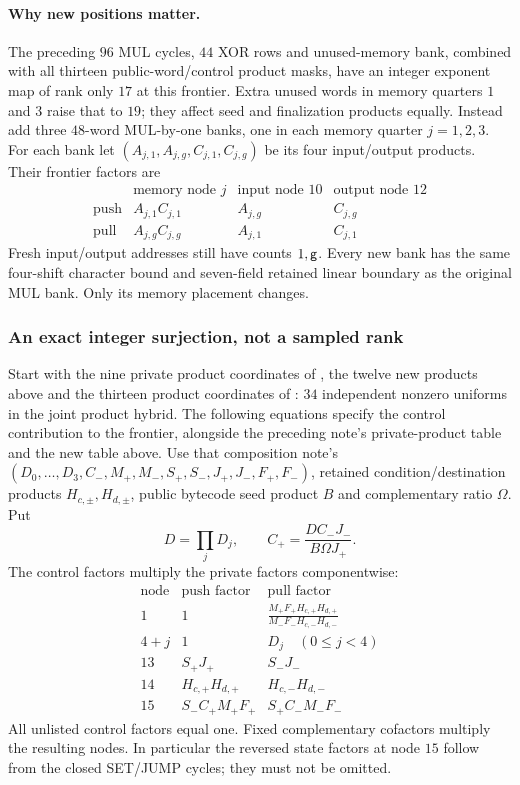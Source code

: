 \paragraph{Why new positions matter.} The preceding $96$ MUL cycles, $44$ XOR rows and unused-memory bank, combined with all thirteen public-word/control product masks, have an integer exponent map of rank only $17$ at this frontier. Extra unused words in memory quarters $1$ and $3$ raise that to $19$; they affect seed and finalization products equally. Instead add three $48$-word MUL-by-one banks, one in each memory quarter $j=1,2,3$. For each bank let $(A_{j,1},A_{j,g},C_{j,1},C_{j,g})$ be its four input/output products. Their frontier factors are
\[
\begin{array}{c|ccc}
 &\text{memory node }j&\text{input node }10&\text{output node }12\\\hline
 \text{push}&A_{j,1}C_{j,1}&A_{j,g}&C_{j,g}\\
 \text{pull}&A_{j,g}C_{j,g}&A_{j,1}&C_{j,1}
\end{array}
\]
Fresh input/output addresses still have counts $1,\mathsf{g}$. Every new bank has the same four-shift character bound and seven-field retained linear boundary as the original MUL bank. Only its memory placement changes.

\subsubsection{An exact integer surjection, not a sampled rank}

Start with the nine private product coordinates of , the twelve new products above and the thirteen product coordinates of : $34$ independent nonzero uniforms in the joint product hybrid. The following equations specify the control contribution to the frontier, alongside the preceding note's private-product table and the new table above. Use that composition note's $(D_0,\ldots,D_3,C_-,M_+,M_-,S_+,S_-,J_+,J_-,F_+,F_-)$, retained condition/destination products $H_{c,\pm},H_{d,\pm}$, public bytecode seed product $B$ and complementary ratio $\Omega$. Put
\[
 D=\prod_jD_j,\qquad C_+=\frac{DC_-J_-}{B\Omega J_+}.
\]
The control factors multiply the private factors componentwise:
\[
\begin{array}{c|cc}
 \text{node}&\text{push factor}&\text{pull factor}\\\hline
 1&1&\displaystyle\frac{M_+F_+H_{c,+}H_{d,+}}{M_-F_-H_{c,-}H_{d,-}}\\[1ex]
 4+j&1&D_j\quad(0\le j<4)\\
 13&S_+J_+&S_-J_-\\
 14&H_{c,+}H_{d,+}&H_{c,-}H_{d,-}\\
 15&S_-C_+M_+F_+&S_+C_-M_-F_-
\end{array}
\]
All unlisted control factors equal one. Fixed complementary cofactors multiply the resulting nodes. In particular the reversed state factors at node $15$ follow from the closed SET/JUMP cycles; they must not be omitted.

